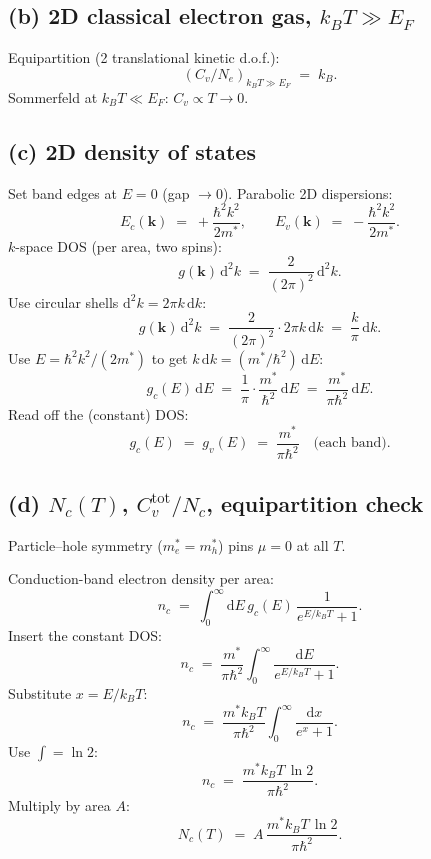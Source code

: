 \documentclass[11pt]{article}
\newcommand{\de}{\mathrm{d}}
\newcommand{\kB}{k_{B}}
\begin{document}
\subsection*{(b) 2D classical electron gas, $\kB T\gg E_F$}

Equipartition (2 translational kinetic d.o.f.):
\begin{equation}
\boxed{\;\left(C_v/N_e\right)_{\kB T\gg E_F} \;=\; \kB.\;}
\label{eq:Cv2Dgas}
\end{equation}
Sommerfeld at $\kB T\ll E_F$: $C_v\propto T\to 0$. 

\subsection*{(c) 2D density of states}

Set band edges at $E=0$ (gap $\to 0$). Parabolic 2D dispersions:
\[
E_c(\bm k) \;=\; +\frac{\hbar^2 k^2}{2m^*},\qquad E_v(\bm k) \;=\; -\frac{\hbar^2 k^2}{2m^*}.
\]
$k$-space DOS (per area, two spins):
\[
g(\bm k)\,\de^2 k \;=\; \frac{2}{(2\pi)^2}\,\de^2 k.
\]
Use circular shells $\de^2 k = 2\pi k\,\de k$:
\[
g(\bm k)\,\de^2 k \;=\; \frac{2}{(2\pi)^2}\cdot 2\pi k\,\de k \;=\; \frac{k}{\pi}\,\de k.
\]
Use $E=\hbar^2 k^2/(2m^*)$ to get $k\,\de k=(m^*/\hbar^2)\,\de E$:
\[
g_c(E)\,\de E \;=\; \frac{1}{\pi}\cdot\frac{m^*}{\hbar^2}\,\de E \;=\; \frac{m^*}{\pi\hbar^2}\,\de E.
\]
Read off the (constant) DOS:
\begin{equation}
\boxed{\;g_c(E) \;=\; g_v(E) \;=\; \frac{m^*}{\pi\hbar^2}\quad\text{(each band)}.\;}
\label{eq:dos2D}
\end{equation}

\subsection*{(d) $N_c(T)$, $C_v^{\text{tot}}/N_c$, equipartition check}

Particle--hole symmetry ($m_e^*=m_h^*$) pins $\mu=0$ at all $T$.

Conduction-band electron density per area:
\[
n_c \;=\; \int_0^\infty\!\de E\,g_c(E)\,\frac{1}{e^{E/\kB T}+1}.
\]
Insert the constant DOS:
\[
n_c \;=\; \frac{m^*}{\pi\hbar^2}\int_0^\infty\!\frac{\de E}{e^{E/\kB T}+1}.
\]
Substitute $x=E/\kB T$:
\[
n_c \;=\; \frac{m^*\kB T}{\pi\hbar^2}\int_0^\infty\!\frac{\de x}{e^x+1}.
\]
Use $\int=\ln 2$:
\[
n_c \;=\; \frac{m^*\kB T\,\ln 2}{\pi\hbar^2}.
\]
Multiply by area $A$:
\begin{equation}
\boxed{\;N_c(T) \;=\; A\,\frac{m^*\kB T\,\ln 2}{\pi\hbar^2}.\;}
\label{eq:Nc}
\end{equation}
\end{document}
